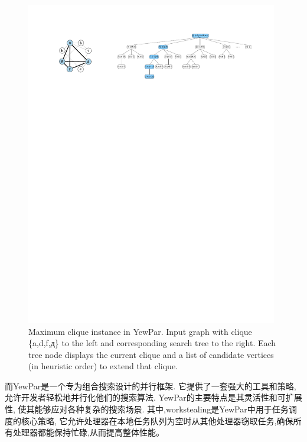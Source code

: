 \documentclass{mproj}
\begin{document}
\begin{figure}[h]
    \centering %
    \includegraphics[width=0.98\textwidth]{images/yewpar_maxclique.pdf} %
    \caption{Maximum clique instance in YewPar. Input graph with clique \{a,d,f,д\} to the left and corresponding search tree to the right.
        Each tree node displays the current clique and a list of candidate vertices (in heuristic order) to extend that clique.\cite{10.1145/3332466.3374537}} %
    \label{fig:yewpar_maxclique} %
\end{figure}
\FloatBarrier

而YewPar是一个专为组合搜索设计的并行框架.
它提供了一套强大的工具和策略,允许开发者轻松地并行化他们的搜索算法.
YewPar的主要特点是其灵活性和可扩展性,
使其能够应对各种复杂的搜索场景.
其中,workstealing是YewPar中用于任务调度的核心策略,
它允许处理器在本地任务队列为空时从其他处理器窃取任务,确保所有处理器都能保持忙碌,从而提高整体性能。
\end{document}
